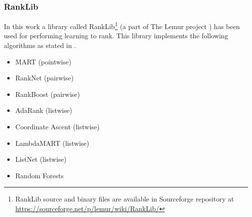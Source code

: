 \subsubsection{RankLib}
In this work a library called RankLib\footnote{RankLib source and binary files are available in Sourceforge repository at \url{https://sourceforge.net/p/lemur/wiki/RankLib/}} (a part of The Lemur project \cite{lemur}) has been used for performing learning to rank. This library implements the following algorithms as stated in \cite{ranklib}.
\begin{itemize}
\item MART \cite{MART} (pointwise)
\item RankNet \cite{RankNet} (pairwise)
\item RankBoost \cite{RankBoost} (pairwise)
\item AdaRank \cite{AdaRank} (listwise)
\item Coordinate Ascent \cite{CoordinateAscent} (listwise)
\item LambdaMART \cite{LambdaMART} (listwise)
\item ListNet \cite{ListNet} (listwise)
\item Random Forests \cite{RandomForests} 
\end{itemize}